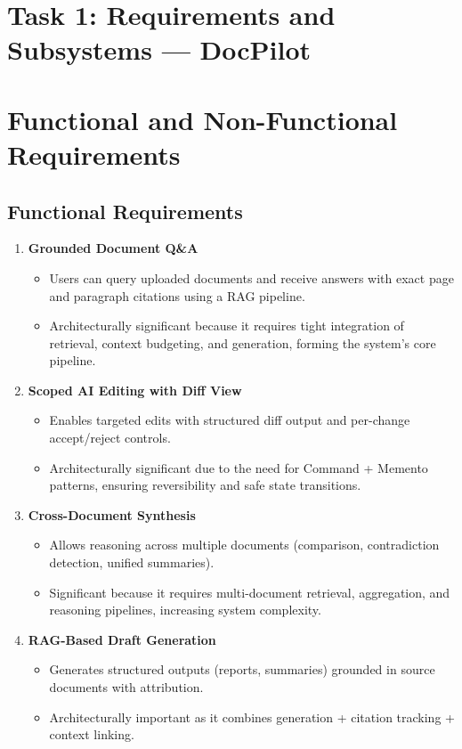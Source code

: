 \documentclass[12pt]{article}
\begin{document}
\section*{Task 1: Requirements and Subsystems --- DocPilot}

\section{Functional and Non-Functional Requirements}

\subsection{Functional Requirements}

\begin{enumerate}
   \item \textbf{Grounded Document Q\&A}
   \begin{itemize}
      \item Users can query uploaded documents and receive answers with exact page and paragraph citations using a RAG pipeline.
      \item Architecturally significant because it requires tight integration of retrieval, context budgeting, and generation, forming the system's core pipeline.
   \end{itemize}

   \item \textbf{Scoped AI Editing with Diff View}
   \begin{itemize}
      \item Enables targeted edits with structured diff output and per-change accept/reject controls.
      \item Architecturally significant due to the need for Command + Memento patterns, ensuring reversibility and safe state transitions.
   \end{itemize}

   \item \textbf{Cross-Document Synthesis}
   \begin{itemize}
      \item Allows reasoning across multiple documents (comparison, contradiction detection, unified summaries).
      \item Significant because it requires multi-document retrieval, aggregation, and reasoning pipelines, increasing system complexity.
   \end{itemize}

   \item \textbf{RAG-Based Draft Generation}
   \begin{itemize}
      \item Generates structured outputs (reports, summaries) grounded in source documents with attribution.
      \item Architecturally important as it combines generation + citation tracking + context linking.
   \end{itemize}


\end{enumerate}
\end{document}

